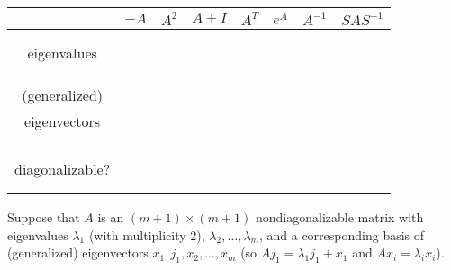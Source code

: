 \documentclass[11pt]{article}
\begin{document}
\begin{landscape}
\begin{tabular}{ c | c | c | c | c | c | c | c  }
& \phantom{aaaa} $-A$  \phantom{aaaa} & \phantom{aaaa} $A^{2}$ \phantom{aaaa} & \phantom{aaaa} $A + I$ \phantom{aaaa} & \phantom{aaaa} $A^T$ \phantom{aaaa} & \phantom{aaaa} $e^{A}$\phantom{aaaa} & \phantom{aaaa} $A^{-1}$ \phantom{aaaa} & \phantom{aaaa} $SAS^{-1}$ \phantom{aaaa} \\ \hline \hline
\makecell{\phantom{aaaaaaaa} \\\phantom{aaaaaaaa} \\ eigenvalues \\ \phantom{aaaaaaaa} \\ \phantom{aaaaaaaa}} & &&& &&  \\ \hline
\makecell{\phantom{aaaaaaaa} \\ (generalized) \\ eigenvectors \\ \phantom{aaaaaaaa} \\ \phantom{aaaaaaaa}} &&&& && \\ \hline
\makecell{\phantom{aaaaaaaa} \\\phantom{aaaaaaaa} \\ diagonalizable? \\ \phantom{aaaaaaaa} \\ \phantom{aaaaaaaa}} &&&& &&
\end{tabular}




\end{landscape}

 \pagebreak
 


Suppose that $A$ is an $(m+1) \times (m+1)$ nondiagonalizable matrix with eigenvalues $\lambda_1$ (with multiplicity 2), $\lambda_2, \dots, \lambda_m$, and a corresponding basis of (generalized) eigenvectors $x_1, j_1, x_2, \dots, x_m$ (so $Aj_1 = \lambda_1 j_1 + x_1$ and $Ax_i = \lambda_i x_i$).
\end{document}
